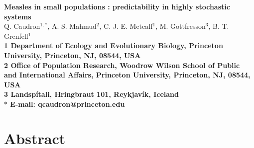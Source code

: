 \documentclass[10pt]{article}
\date{}
\begin{document}
\begin{flushleft}
{\Large
\textbf{Measles in small populations : predictability in highly stochastic systems}
}
\\
Q. Caudron$^{1,\ast}$, 
A. S. Mahmud$^{2}$, 
C. J. E. Metcalf$^{1}$,
M. Gottfre{\dh}sson$^3$,
B. T. Grenfell$^{1}$
\\
\bf{1} Department of Ecology and Evolutionary Biology, Princeton University, Princeton, NJ, 08544, USA
\\
\bf{2} Office of Population Research, Woodrow Wilson School of Public and International Affairs, Princeton University, Princeton, NJ, 08544, USA
\\
\bf{3} Landsp\'{i}tali, Hringbraut 101, Reykjav\'{i}k, Iceland
\\
$\ast$ E-mail: qcaudron@princeton.edu
\end{flushleft}













\section*{Abstract}
\end{document}
